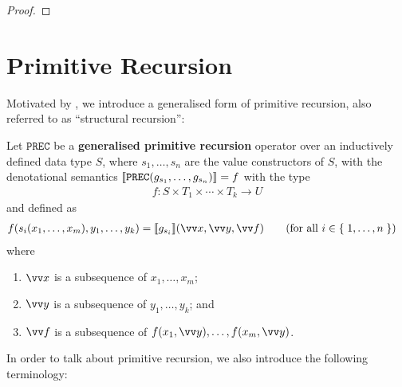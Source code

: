 \begin{proof}  \end{proof}

\section{Primitive Recursion}

\label{sec:primitive-recursion}

Motivated by \cite{leivant-1995}, we introduce a generalised form of primitive
recursion, also referred to as ``structural recursion''\cite{hofmann-2002}:


\begin{definition} Let $\mathtt{PREC}$ be a \textbf{generalised primitive
recursion} operator over an inductively defined data type $S$, where
$s_1,\ldots,s_n$ are the value constructors of $S$, with the denotational
semantics ${\mathopen{}\left\llbracket{\mathtt{PREC}{\ensuremath{\mathopen{}\left({g_{s_1},\ldots,g_{s_n}}\right)\mathclose{}}}}\right\rrbracket\mathclose{}} = f$ with the
type\begin{align*}
%
f : S \times T_1 \times \cdots \times T_k \rightarrow U
%
\end{align*}and defined as\begin{align*}
%
f\p{s_i\p{x_1,\ldots,x_m},y_1,\ldots,y_k} = \sem{g_{s_i}}\p{\vect{x}, \vect{y},
\vect{f}} & \quad \quad \p{\text{for all $i \in \set{1, \ldots, n}$}}
%
\end{align*} where

\begin{enumerate}

\item $\vect{x}$ is a subsequence of $x_1,\ldots,x_m$;

\item $\vect{y}$ is a subsequence of $y_1,\ldots,y_k$; and

\item $\vect{f}$ is a subsequence of $f\p{x_1, \vect{y}},\ldots, f\p{x_m,
\vect{y}}$.

\end{enumerate}

\end{definition}

In order to talk about primitive recursion, we also introduce the following
terminology:

